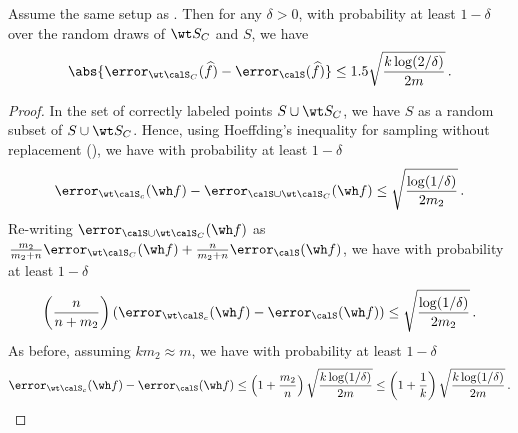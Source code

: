 \begin{lemma} \label{lem:clear_error_multi}
    Assume the same setup as . 
    Then for any $\delta >0$, with probability at least $1-\delta$ 
    over the random draws of $\wt S_C$ and $S$, we have 
        $$\abs{\error_{\wt \calS_C}(\widehat f) - \error_{\calS}(\widehat f) } \le 1.5 \sqrt{\frac{k\log(2/\delta)}{2m}}\,.$$ %
\end{lemma} 
\begin{proof}
    In the set of correctly labeled points $S \cup \wt S_C$,
    we have $S$ as a random subset of $S \cup \wt S_C$. 
    Hence, using Hoeffding's inequality 
    for sampling without replacement 
    (), 
    we have with probability at least $1-\delta$
    \begin{align}
        \error_{\wt \calS_c} (\wh f)- \error_{\calS \cup \wt \calS_C}( \wh f) \le  \sqrt{\frac{\log(1/\delta)}{2m_2}} \,.
    \end{align}
    Re-writing $\error_{\calS \cup \wt \calS_C}( \wh f)$ 
    as $\frac{m_2}{m_2 + n} \error_{\wt \calS_C }(\wh f) + \frac{n}{m_2 + n} \error_{\calS }(\wh f)$, 
    we have with probability at least $1-\delta$
    \begin{align}
       \left(\frac{n}{n+m_2}\right) \left(\error_{\wt \calS_c} (\wh f)- \error_{\calS}( \wh f) \right) \le  \sqrt{\frac{\log(1/\delta)}{2m_2}} \,.
    \end{align}
    As before, assuming $km_2 \approx m$, 
    we have with probability at least $1-\delta$ 
    \begin{align}
        \error_{\wt \calS_c} (\wh f)- \error_{\calS}( \wh f) \le \left(1+\frac{m_2}{n}\right)  \sqrt{\frac{k\log(1/\delta)}{2m}} \le \left( 1 + \frac{1}{k}\right) \sqrt{\frac{k\log(1/\delta)}{2m}} \,. \label{eq:lemma3_final_multi}
    \end{align} 
\end{proof}

